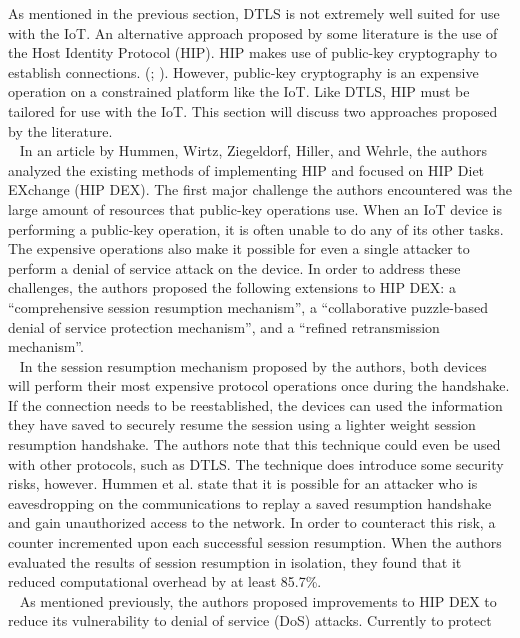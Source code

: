 \documentclass[letterpaper, 12pt]{article}
\begin{document}
\begin{flushleft}
As mentioned in the previous section, DTLS is not extremely well suited for use with the IoT. An alternative
approach proposed by some literature is the use of the Host Identity Protocol (HIP). HIP makes use of public-key
cryptography to establish connections. (\cite{Hummen}; \cite{Garcia-Morchon:2013:SII:2462096.2462117}). However,
public-key cryptography is an expensive operation on a constrained platform like the IoT. Like DTLS, HIP must
be tailored for use with the IoT. This section will discuss two approaches proposed by the literature. \\ 
~\newline
In an article by Hummen, Wirtz, Ziegeldorf, Hiller, and Wehrle, the authors analyzed the existing methods of 
implementing HIP and focused on HIP Diet EXchange (HIP DEX). The first major challenge the authors encountered
was the large amount of resources that public-key operations use. When an IoT device is performing a public-key operation,
it is often unable to do any of its other tasks. The expensive operations also make it possible for even a single attacker
to perform a denial of service attack on the device. In order to address these challenges, the authors proposed the following extensions to HIP DEX: 
a ``comprehensive session resumption mechanism'', a ``collaborative puzzle-based denial of service protection mechanism'', and a
``refined retransmission mechanism''. \\
~\newline
In the session resumption mechanism proposed by the authors, both devices will perform their most expensive protocol operations once during the handshake.
If the connection needs to be reestablished, the devices can used the information they have saved to securely resume the session using a lighter weight
session resumption handshake. The authors note that this technique could even be used with other protocols, such as DTLS. The technique does introduce some
security risks, however. Hummen et al. state that it is possible for an attacker who is eavesdropping on the communications to replay a saved resumption
handshake and gain unauthorized access to the network. In order to counteract this risk, a counter incremented upon each successful session resumption. 
When the authors evaluated the results of session resumption in isolation, they found that it reduced computational overhead by at least 85.7\%. \\
~\newline
As mentioned previously, the authors proposed improvements to HIP DEX to reduce its vulnerability to denial of service (DoS) attacks. Currently to protect

\end{flushleft}
\end{document}
